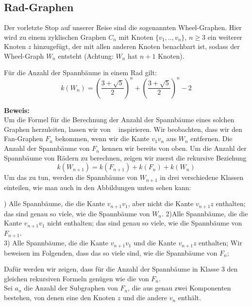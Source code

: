 \subsection{Rad-Graphen}
Der vorletzte Stop auf unserer Reise sind die sogenannten Wheel-Graphen. Hier wird zu einem zyklischen Graphen $C_n$ mit Knoten $\{v_1,..,v_n\}$, $n \geq 3$ ein weiterer Knoten $z$ hinzugefügt, der mit allen anderen Knoten benachbart ist, sodass der Wheel-Graph $W_{n}$ entsteht (Achtung: $W_n$ hat $n+1$ Knoten).
\begin{Tm}
Für die Anzahl der Spannbäume in einem Rad gilt:
\begin{equation}
 \mathit{k}(W_n) = (\frac{3+\sqrt{5}}{2})^n+(\frac{3+\sqrt{5}}{2})^n-2
 \label{wn}
\end{equation}
\end{Tm}
\textbf{Beweis:}\\
Um die Formel für die Berechnung der Anzahl der Spannbäume eines solchen Graphen herzuleiten, lassen wir von ~\cite{sedlacek_1970} inspirieren.
Wir beobachten, dass wir den Fan-Graphen $F_n$ bekommen, wenn wir die Kante $v_1v_n$ aus $W_n$ entfernen.
Die Anzahl der Spannbäume von $F_n$ kennen wir bereits von oben.
Um die Anzahl der Spannbäume von Rädern zu berechnen, zeigen wir zuerst die rekursive Beziehung
\begin{equation}
 \mathit{k}(W_{n+1}) = \mathit{k}(F_{n+1}) + \mathit{k}(F_n) + \mathit{k}(W_n)
\end{equation}
Um das zu tun, werden die Spannbäume von $W_{n+1}$ in drei verschiedene Klassen einteilen, wie man auch in den Abbildungen unten sehen kann:\\
\par %
\begingroup
\leftskip=20pt%
\rightskip=20pt
) Alle Spannbäume, die die Kante $v_{n+1}v_1$, aber nicht die Kante $v_{n+1}z$ enthalten; das sind genau so viele, wie die Spannbäume von $W_n$.
2)Alle Spannbäume, die die Kante $v_{n+1}v_1$ nicht enthalten; das sind genau so viele, wie die Spannbäume von $F_{n+1}$.\\
3) Alle Spannbäume, die die Kante $v_{n+1}v_1$ und die Kante $v_{n+1}z$ enthalten; Wir beweisen im Folgenden, dass das so viele sind, wie die Spannbäume von $F_n$;
\par
\endgroup
Dafür werden wir zeigen, dass für die Anzahl der Spannbäume in Klasse 3 den gleichen rekursiven Formeln genügen wie die von $F_n$.\\
Sei $a_n$ die Anzahl der Subgraphen von $F_n$, die aus genau zwei Komponenten bestehen, von denen eine den Knoten $z$ und die andere $v_n$ enthält.
